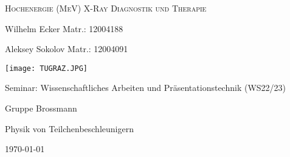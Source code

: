\label{sec:Titelblatt}

\begin{titlepage}
    \centering
    \vspace{6cm}
    {\scshape\Large Hochenergie (MeV) X-Ray Diagnostik und Therapie \par}
    \vspace{3cm}
    {\Large Wilhelm Ecker Matr.: 12004188 \par } 
    {\Large Aleksey Sokolov Matr.: 12004091 \par}
    \vspace{2cm}
    {\texttt{[image: TUGRAZ.JPG]}\par}
    
    \vfill
    {\large Seminar: Wissenschaftliches Arbeiten und Präsentationstechnik (WS22/23) \par}
    {\large Gruppe Brossmann\par}
    {\large Physik von Teilchenbeschleunigern\par}
    {\large \today\par} 
\end{titlepage}